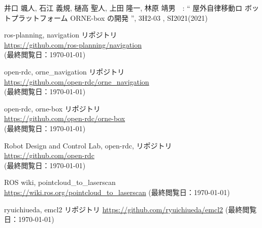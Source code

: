 \documentclass[twocolumn, 9pt]{jsproceedings}
\begin{document}
\footnotesize
\begin{thebibliography}{99}

井口 颯人, 石江 義規, 樋高 聖人, 上田 隆一, 林原 靖男　: “ 屋外自律移動ロ
ボットプラットフォーム ORNE-box の開発 ”, 3H2-03 , SI2021(2021)

ros-planning, navigation リポジトリ\\
\url{https://github.com/ros-planning/navigation}\\
(最終閲覧日：\today)

open-rdc, orne\_navigation リポジトリ\\
\url{https://github.com/open-rdc/orne_navigation}\\
(最終閲覧日：\today)

open-rdc, orne-box リポジトリ\\
\url{https://github.com/open-rdc/orne-box}\\
(最終閲覧日：\today)

Robot Design and Control Lab, open-rdc, リポジトリ\\
\url{https://github.com/open-rdc}\\
(最終閲覧日：\today)

ROS wiki, pointcloud\_to\_laserscan
\url{https://wiki.ros.org/pointcloud_to_laserscan}
(最終閲覧日：\today)

ryuichiueda, emcl2 リポジトリ
\url{https://github.com/ryuichiueda/emcl2}
(最終閲覧日：\today)


\end{thebibliography}
\normalsize
\end{document}
